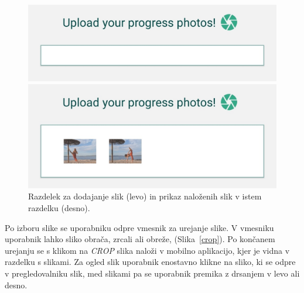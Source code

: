 \documentclass[a4paper, 12pt]{book}
\begin{document}
\begin{figure}[ht]
\centering
  \begin{minipage}[b]{0.56\textwidth}
    \includegraphics[width=\textwidth]{emptyphoto.jpg}\centering
  \end{minipage}
  \begin{minipage}[b]{0.42\textwidth}
    \includegraphics[width=\textwidth]{slike.jpg}\centering
  \end{minipage}
    \caption{Razdelek za dodajanje slik (levo) in prikaz naloženih slik v istem razdelku (desno). \\}
    \label{slike}
\end{figure}

Po izboru slike se uporabniku odpre vmesnik za urejanje slike. V vmesniku uporabnik lahko sliko obrača, zrcali ali obreže, (Slika~\ref{crop}). Po končanem urejanju se s klikom na \textit{CROP} slika naloži v mobilno aplikacijo, kjer je vidna v razdelku s slikami. Za ogled slik uporabnik enostavno klikne na sliko, ki se odpre v pregledovalniku slik, med slikami pa se uporabnik premika z drsanjem v levo ali desno.
\end{document}
